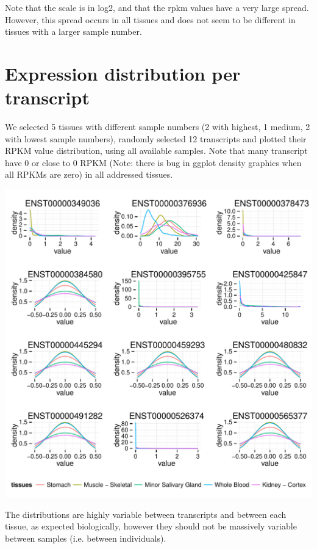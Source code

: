 \documentclass{article}\usepackage[]{graphicx}\usepackage[]{color}
\makeatletter
\def\maxwidth{ %
  \ifdim\Gin@nat@width>\linewidth
    \linewidth
  \else
    \Gin@nat@width
  \fi
}
\newenvironment{knitrout}{}{} %
\makeatother
\begin{document}
Note that the scale is in log2, and that the rpkm values have a very large spread. However, this spread occurs in all tissues and does not seem to be different in tissues with a larger sample number.\par

\section{Expression distribution per transcript}

We selected 5 tissues with different sample numbers (2 with highest, 1 medium, 2 with lowest sample numbers), randomly selected 12 transcripts and plotted their RPKM value distribution, using all available samples. Note that many transcript have 0 or close to 0 RPKM (Note: there is bug in ggplot density graphics when all RPKMs are zero) in all addressed tissues. 

\begin{knitrout}
\color{fgcolor}
\includegraphics[width=\maxwidth]{figure/density_plot_example_transcripts-1} 

\end{knitrout}

The distributions are highly variable between transcripts and between each tissue, as expected biologically, however they should not be massively variable between samples (i.e. between individuals). 
\end{document}
